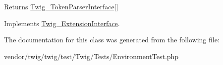 \begin{DoxyReturn}{Returns}
\hyperlink{interfaceTwig__TokenParserInterface}{Twig\+\_\+\+Token\+Parser\+Interface}\mbox{[}\mbox{]} 
\end{DoxyReturn}


Implements \hyperlink{interfaceTwig__ExtensionInterface_a37669c17957e93e015a269d9caf8422b}{Twig\+\_\+\+Extension\+Interface}.



The documentation for this class was generated from the following file\+:\begin{DoxyCompactItemize}
\item 
vendor/twig/twig/test/\+Twig/\+Tests/Environment\+Test.\+php\end{DoxyCompactItemize}
